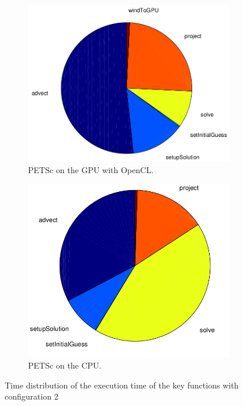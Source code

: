 \begin{figure}[ht]
	\center
	
	\begin{subfigure}{0.45\textwidth}
		\center
		\includegraphics[width=1.0\textwidth]{results/data/td/td_conf2_petsc_gpu}
		\caption{PETSc on the GPU with OpenCL.}
		\label{fig:td_conf2_petsc_gpu}
	\end{subfigure}
	\begin{subfigure}{0.45\textwidth}
		\center
		\includegraphics[width=1.0\textwidth]{results/data/td/td_conf2_petsc_cpu}
		\caption{PETSc on the CPU.}
		\label{fig:td_conf2_petsc_cpu}
	\end{subfigure}
	\caption{Time distribution of the execution time of the key functions
			with configuration 2}
	\label{fig:td_conf2}
	
\end{figure}

